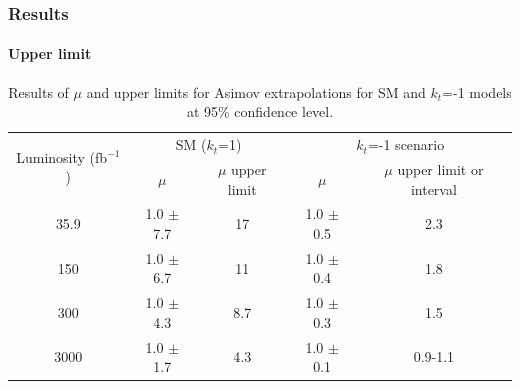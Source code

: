 \documentclass[11pt]{beamer}
\begin{document}
 \begin{frame}
 \frametitle{Results}
 \framesubtitle{Upper limit}
 \begin{table}[ht]
 {  \tiny
 		\caption[Results of $\mu$ and upper limits for SM and $k_t$=-1]{Results of $\mu$ and upper limits for Asimov extrapolations for SM  and $k_t$=-1 models at 95$\%$ confidence level.}
 		\begin{tabular}{|c|c|c|c|c|}
 			\hline
 			\multirow{2}{*}{Luminosity (fb$^{-1}$)}  &\multicolumn{2}{c|}{SM ($k_t$=1)} &\multicolumn{2}{c|}{$k_t$=-1 scenario}\\
 			\hhline{~----}                        &$\mu$  &$\mu$ upper limit & $\mu$ &$\mu$ upper limit or interval\\
 			\hline
 			35.9 & 1.0 $\pm$ 7.7 & 17 & 1.0 $\pm$ 0.5 & 2.3 \\
 			\hline
 			150& 1.0 $\pm$ 6.7& 11 & 1.0 $\pm$ 0.4 &1.8\\
 			\hline
 			300&1.0 $\pm$ 4.3 &8.7 & 1.0 $\pm$ 0.3 &1.5 \\
 			\hline
 			3000&1.0 $\pm$ 1.7 & 4.3 & 1.0 $\pm$ 0.1 & 0.9-1.1\\
 			\hline
 		\end{tabular}
 		\label{upper}
                }
 	\end{table}
 \end{frame}



\end{document}
